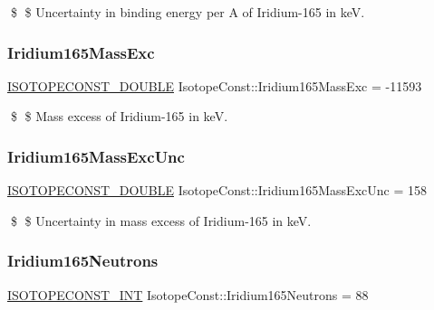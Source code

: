 \$ \$ Uncertainty in binding energy per A of Iridium-\/165 in keV. \mbox{\label{group___isotope_const-_iridium-_ir165_ga7c6456fe2a26f65103d356eb70e8ff64}} 
\subsubsection{\texorpdfstring{Iridium165\+Mass\+Exc}{Iridium165MassExc}}
{\footnotesize\ttfamily \mbox{\hyperlink{group___isotope_const-_macros_ga8f45a7272ce02c0b4c65c44636ed719a}{I\+S\+O\+T\+O\+P\+E\+C\+O\+N\+S\+T\+\_\+\+D\+O\+U\+B\+LE}} Isotope\+Const\+::\+Iridium165\+Mass\+Exc = -\/11593}

\$ \$ Mass excess of Iridium-\/165 in keV. \mbox{\label{group___isotope_const-_iridium-_ir165_ga08a353faafb18847ef16615e505c45d7}} 
\subsubsection{\texorpdfstring{Iridium165\+Mass\+Exc\+Unc}{Iridium165MassExcUnc}}
{\footnotesize\ttfamily \mbox{\hyperlink{group___isotope_const-_macros_ga8f45a7272ce02c0b4c65c44636ed719a}{I\+S\+O\+T\+O\+P\+E\+C\+O\+N\+S\+T\+\_\+\+D\+O\+U\+B\+LE}} Isotope\+Const\+::\+Iridium165\+Mass\+Exc\+Unc = 158}

\$ \$ Uncertainty in mass excess of Iridium-\/165 in keV. \mbox{\label{group___isotope_const-_iridium-_ir165_ga94b996e9bcab90deb0371a7df3cb9627}} 
\subsubsection{\texorpdfstring{Iridium165\+Neutrons}{Iridium165Neutrons}}
{\footnotesize\ttfamily \mbox{\hyperlink{group___isotope_const-_macros_ga5f18360b3e99483a35c32d789e62621c}{I\+S\+O\+T\+O\+P\+E\+C\+O\+N\+S\+T\+\_\+\+I\+NT}} Isotope\+Const\+::\+Iridium165\+Neutrons = 88}

